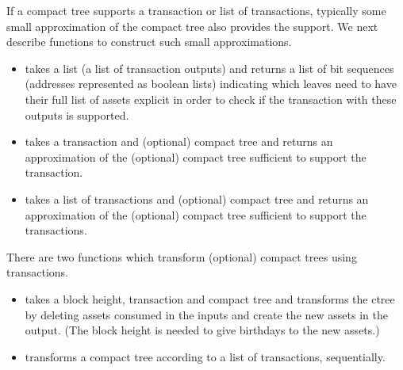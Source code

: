 If a compact tree supports a transaction or list of transactions,
typically some small approximation of the compact tree also provides the support.
We next describe functions to construct such small approximations.
\begin{itemize}
\item {} takes a {} list (a list of transaction outputs)
and returns a list of bit sequences (addresses represented as boolean lists)
indicating which leaves need to have their full list of assets explicit
in order to check if the transaction with these outputs
is supported. 
\item {} takes a transaction and (optional) compact tree
and returns an approximation of the (optional) compact tree sufficient to support the transaction.
\item {} takes a list of transactions and (optional) compact tree
and returns an approximation of the (optional) compact tree sufficient to support the transactions.
\end{itemize}

There are two functions which transform (optional) compact trees using transactions.
\begin{itemize}
\item {} takes a block height, transaction and compact tree
and transforms the ctree by deleting assets consumed in the inputs and
create the new assets in the output. (The block height is needed to give
birthdays to the new assets.)
\item {} transforms a compact tree according to a
list of transactions, sequentially.
\end{itemize}

